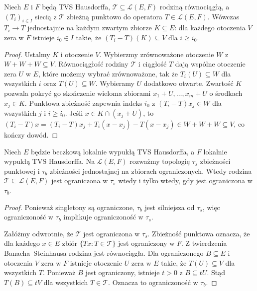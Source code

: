 \begin{twierdzenie}
\label{thm:equicont-compact-conv}
Niech $E$ i $F$ będą TVS Hausdorffa,
$\mathcal T\subseteq\mathcal L(E,F)$ rodziną równociągłą,
a $(T_i)_{i\in I}$ siecią z $\mathcal T$ zbieżną punktowo
do operatora $T\in\mathcal L(E,F)$.
Wówczas $T_i\to T$ jednostajnie na każdym zwartym
zbiorze $K\subseteq E$: dla każdego otoczenia $V$ zera
w $F$ istnieje $i_0\in I$ takie, że
$(T_i-T)(K)\subseteq V$ dla $i\ge i_0$.
\end{twierdzenie}
\begin{proof}
Ustalmy $K$ i otoczenie $V$. Wybierzmy zrównoważone
otoczenie $W$ z $W+W+W\subseteq V$. Równociągłość
rodziny $\mathcal T$ i ciągłość $T$ dają wspólne
otoczenie zera $U$ w $E$, które możemy wybrać
zrównoważone, tak że $T_i(U)\subseteq W$ dla wszystkich
$i$ oraz $T(U)\subseteq W$.
Wybieramy $U$ dodatkowo otwarte. Zwartość $K$
pozwala pokryć go skończenie wieloma zbiorami
$x_1+U,\ldots,x_m+U$ o środkach $x_j\in K$.
Punktowa zbieżność zapewnia indeks $i_0$ z
$(T_i-T)x_j\in W$ dla wszystkich $j$ i $i\ge i_0$.
Jeśli $x\in K\cap(x_j+U)$, to
$(T_i-T)x=(T_i-T)x_j+T_i(x-x_j)-T(x-x_j)\in W+W+W
\subseteq V$, co kończy dowód.
\end{proof}

\begin{stwierdzenie}
\label{prop:sot-bot-bounded}
Niech $E$ będzie beczkową lokalnie wypukłą TVS Hausdorffa,
a $F$ lokalnie wypukłą TVS Hausdorffa. Na $\mathcal L(E,F)$
rozważmy topologię $\tau_s$ zbieżności punktowej i
$\tau_b$ zbieżności jednostajnej na zbiorach ograniczonych.
Wtedy rodzina $\mathcal T\subseteq\mathcal L(E,F)$
jest ograniczona w $\tau_s$ wtedy i tylko wtedy,
gdy jest ograniczona w $\tau_b$.
\end{stwierdzenie}
\begin{proof}
Ponieważ singletony są ograniczone, $\tau_b$ jest
silniejsza od $\tau_s$, więc ograniczoność w $\tau_b$
implikuje ograniczoność w $\tau_s$.

Załóżmy odwrotnie, że $\mathcal T$ jest ograniczona
w $\tau_s$. Zbieżność punktowa oznacza, że dla każdego
$x\in E$ zbiór $\{Tx:T\in\mathcal T\}$ jest ograniczony
w $F$. Z twierdzenia Banacha--Steinhausa rodzina jest
równociągła. Dla ograniczonego $B\subseteq E$ i otoczenia
$V$ zera w $F$ istnieje otoczenie $U$ zera w $E$
takie, że $T(U)\subseteq V$ dla wszystkich $T$.
Ponieważ $B$ jest ograniczony, istnieje $t>0$
z $B\subseteq tU$. Stąd $T(B)\subseteq tV$ dla wszystkich
$T\in\mathcal T$. Oznacza to ograniczoność w $\tau_b$.
\end{proof}

